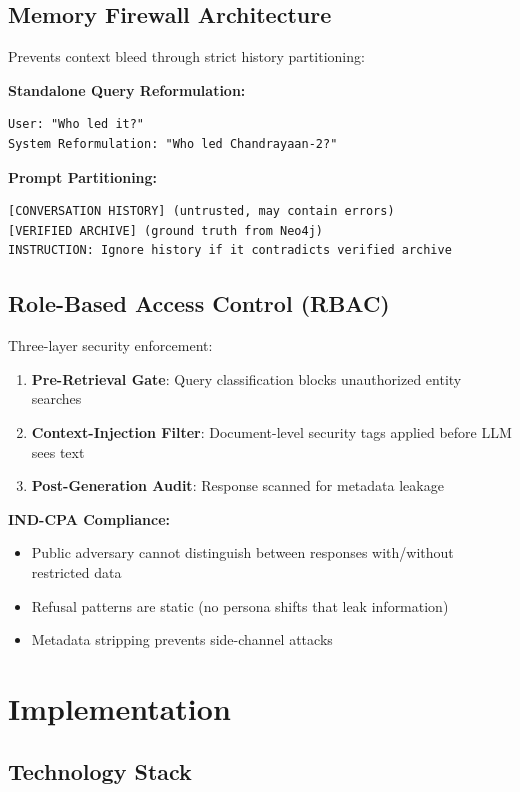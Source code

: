 \documentclass[journal,12pt,twocolumn]{IEEEtran}
\begin{document}
\subsection{Memory Firewall Architecture}

Prevents context bleed through strict history partitioning:

\textbf{Standalone Query Reformulation:}
\begin{verbatim}
User: "Who led it?"
System Reformulation: "Who led Chandrayaan-2?"
\end{verbatim}

\textbf{Prompt Partitioning:}
\begin{verbatim}
[CONVERSATION HISTORY] (untrusted, may contain errors)
[VERIFIED ARCHIVE] (ground truth from Neo4j)
INSTRUCTION: Ignore history if it contradicts verified archive
\end{verbatim}

\subsection{Role-Based Access Control (RBAC)}

Three-layer security enforcement:

\begin{enumerate}
\item \textbf{Pre-Retrieval Gate}: Query classification blocks unauthorized entity searches
\item \textbf{Context-Injection Filter}: Document-level security tags applied before LLM sees text
\item \textbf{Post-Generation Audit}: Response scanned for metadata leakage
\end{enumerate}

\textbf{IND-CPA Compliance:}
\begin{itemize}
\item Public adversary cannot distinguish between responses with/without restricted data
\item Refusal patterns are static (no persona shifts that leak information)
\item Metadata stripping prevents side-channel attacks
\end{itemize}

\section{Implementation}

\subsection{Technology Stack}
\end{document}
